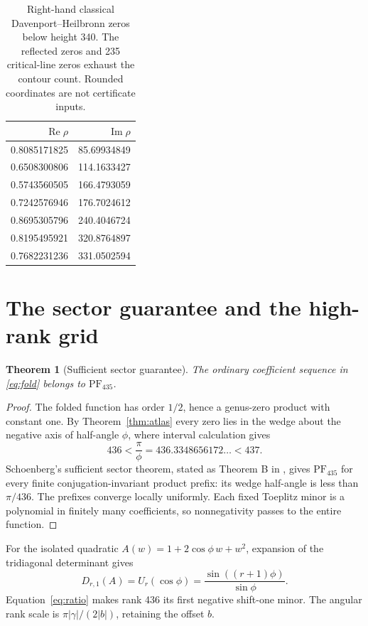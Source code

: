 \documentclass[11pt]{article}
\newtheorem{theorem}{Theorem}[section]
\theoremstyle{remark}
\newcommand{\PF}{\mathrm{PF}}
\DeclareMathOperator{\Rea}{Re}
\DeclareMathOperator{\Ima}{Im}
\begin{document}
\begin{table}[ht]
\centering
\caption{Right-hand classical Davenport--Heilbronn zeros below height 340.
The reflected zeros and 235 critical-line zeros exhaust the contour count.
Rounded coordinates are not certificate inputs.}\label{tab:dhzeros}
\begin{tabular}{rr}
\toprule \(\Rea\rho\) & \(\Ima\rho\)\\ \midrule
0.8085171825 & 85.69934849\\
0.6508300806 & 114.1633427\\
0.5743560505 & 166.4793059\\
0.7242576946 & 176.7024612\\
0.8695305796 & 240.4046724\\
0.8195495921 & 320.8764897\\
0.7682231236 & 331.0502594\\
\bottomrule
\end{tabular}
\end{table}

\section{The sector guarantee and the high-rank grid}
\begin{theorem}[Sufficient sector guarantee]\label{thm:pf}
The ordinary coefficient sequence in \eqref{eq:fold} belongs to
\(\PF_{435}\).
\end{theorem}
\begin{proof}
The folded function has order \(1/2\), hence a genus-zero product with
constant one. By Theorem~\ref{thm:atlas} every zero lies in the wedge about the
negative axis of half-angle \(\phi\), where interval calculation gives
\begin{equation}\label{eq:ratio}
 436<\frac{\pi}{\phi}=436.3348656172\ldots<437.
\end{equation}
Schoenberg's sufficient sector theorem, stated as Theorem B in
\cite{katkova2005}, gives \(\PF_{435}\) for every finite conjugation-invariant
product prefix: its wedge half-angle is less than \(\pi/436\).
The prefixes converge locally uniformly. Each fixed Toeplitz minor is a
polynomial in finitely many coefficients, so nonnegativity passes to the
entire function.
\end{proof}
For the isolated quadratic \(A(w)=1+2\cos\phi\,w+w^2\), expansion of the
tridiagonal determinant gives
\begin{equation}\label{eq:chebyshev}
 D_{r,1}(A)=U_r(\cos\phi)=\frac{\sin((r+1)\phi)}{\sin\phi}.
\end{equation}
Equation~\eqref{eq:ratio} makes rank 436 its first negative shift-one minor.
The angular rank scale is \(\pi|\gamma|/(2|b|)\), retaining the offset \(b\).
\end{document}
